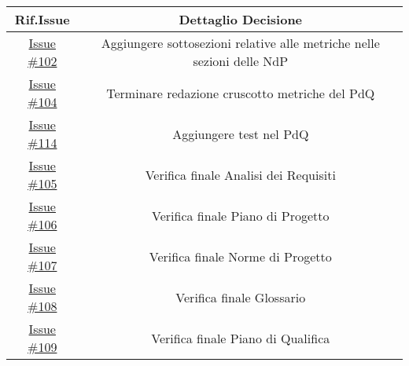 \documentclass[10pt]{article}
\begin{document}
\begin{center}
\begin{tabular}{|>{\hspace{20pt}}c<{\hspace{20pt}}|>{\hspace{20pt}}c<{\hspace{20pt}}|}
	\hline
	    \textbf{Rif.Issue} & \textbf{Dettaglio Decisione}\\
	\hline
		\href{https://github.com/SevenBitsSwe/7BitsDocs/issues/102}{Issue \#102} & Aggiungere sottosezioni relative alle metriche nelle sezioni delle NdP\\
	\hline
        \href{https://github.com/SevenBitsSwe/7BitsDocs/issues/104}{Issue \#104} & Terminare redazione cruscotto metriche del PdQ\\
	\hline
        \href{https://github.com/SevenBitsSwe/7BitsDocs/issues/114}{Issue \#114} & Aggiungere test nel PdQ\\
	\hline
        \href{https://github.com/SevenBitsSwe/7BitsDocs/issues/105}{Issue \#105} & Verifica finale Analisi dei Requisiti\\
	\hline
        \href{https://github.com/SevenBitsSwe/7BitsDocs/issues/106}{Issue \#106} & Verifica finale Piano di Progetto\\
	\hline
        \href{https://github.com/SevenBitsSwe/7BitsDocs/issues/107}{Issue \#107} & Verifica finale Norme di Progetto\\
	\hline
        \href{https://github.com/SevenBitsSwe/7BitsDocs/issues/108}{Issue \#108} & Verifica finale Glossario\\
	\hline
        \href{https://github.com/SevenBitsSwe/7BitsDocs/issues/109}{Issue \#109} & Verifica finale Piano di Qualifica\\
	\hline
\end{tabular}
\end{center}
\end{document}
